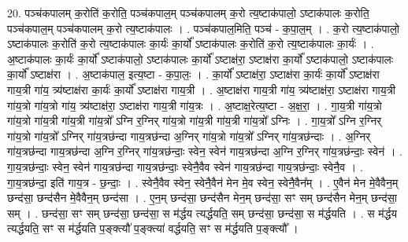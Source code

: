 \documentclass[17pt]{extarticle}
\begin{document}
20. पञ्च॑कपालम् क॒रोति॑ क॒रोति॒ पञ्च॑कपाल॒म् पञ्च॑कपालम् क॒रो त्य॒ष्टाक॑पालो॒ ऽष्टाक॑पालः क॒रोति॒ पञ्च॑कपाल॒म् पञ्च॑कपालम् क॒रो त्य॒ष्टाक॑पालः । . पञ्च॑कपाल॒मिति॒ पञ्च॑ - क॒पा॒ल॒म् । . क॒रो त्य॒ष्टाक॑पालो॒ ऽष्टाक॑पालः क॒रोति॑ क॒रो त्य॒ष्टाक॑पालः का॒र्यः॑ का॒र्यो᳚ ऽष्टाक॑पालः क॒रोति॑ क॒रो त्य॒ष्टाक॑पालः का॒र्यः॑ । . अ॒ष्टाक॑पालः का॒र्यः॑ का॒र्यो᳚ ऽष्टाक॑पालो॒ ऽष्टाक॑पालः का॒र्यो᳚ ऽष्टाक्ष॑रा॒ ऽष्टाक्ष॑रा का॒र्यो᳚ ऽष्टाक॑पालो॒ ऽष्टाक॑पालः का॒र्यो᳚ ऽष्टाक्ष॑रा । . अ॒ष्टाक॑पाल॒ इत्य॒ष्टा - क॒पा॒लः॒ । . का॒र्यो᳚ ऽष्टाक्ष॑रा॒ ऽष्टाक्ष॑रा का॒र्यः॑ का॒र्यो᳚ ऽष्टाक्ष॑रा गाय॒त्री गा॑य॒ त्र्य॑ष्टाक्ष॑रा का॒र्यः॑ का॒र्यो᳚ ऽष्टाक्ष॑रा गाय॒त्री । . अ॒ष्टाक्ष॑रा गाय॒त्री गा॑य॒ त्र्य॑ष्टाक्ष॑रा॒ ऽष्टाक्ष॑रा गाय॒त्री गा॑य॒त्रो गा॑य॒त्रो गा॑य॒ त्र्य॑ष्टाक्ष॑रा॒ ऽष्टाक्ष॑रा गाय॒त्री गा॑य॒त्रः । . अ॒ष्टाक्ष॒रेत्य॒ष्टा - अ॒क्ष॒रा॒ । . गा॒य॒त्री गा॑य॒त्रो गा॑य॒त्रो गा॑य॒त्री गा॑य॒त्री गा॑य॒त्रो᳚ ऽग्नि र॒ग्निर् गा॑य॒त्रो गा॑य॒त्री गा॑य॒त्री गा॑य॒त्रो᳚ ऽग्निः । . गा॒य॒त्रो᳚ ऽग्नि र॒ग्निर् गा॑य॒त्रो गा॑य॒त्रो᳚ ऽग्निर् गा॑य॒त्रछ॑न्दा गाय॒त्रछ॑न्दा अ॒ग्निर् गा॑य॒त्रो गा॑य॒त्रो᳚ ऽग्निर् गा॑य॒त्रछ॑न्दाः । . अ॒ग्निर् गा॑य॒त्रछ॑न्दा गाय॒त्रछ॑न्दा अ॒ग्नि र॒ग्निर् गा॑य॒त्रछ॑न्दाः॒ स्वेन॒ स्वेन॑ गाय॒त्रछ॑न्दा अ॒ग्नि र॒ग्निर् गा॑य॒त्रछ॑न्दाः॒ स्वेन॑ । . गा॒य॒त्रछ॑न्दाः॒ स्वेन॒ स्वेन॑ गाय॒त्रछ॑न्दा गाय॒त्रछ॑न्दाः॒ स्वेनै॒वैव स्वेन॑ गाय॒त्रछ॑न्दा गाय॒त्रछ॑न्दाः॒ स्वेनै॒व । . गा॒य॒त्रछ॑न्दा॒ इति॑ गाय॒त्र - छ॒न्दाः॒ । . स्वेनै॒वैव स्वेन॒ स्वेनै॒वैन॑ मेन मे॒व स्वेन॒ स्वेनै॒वैन᳚म् । . ए॒वैन॑ मेन मे॒वैवैन॒म् छन्द॑सा॒ छन्द॑सैन मे॒वैवैन॒म् छन्द॑सा । . ए॒न॒म् छन्द॑सा॒ छन्द॑सैन मेन॒म् छन्द॑सा॒ सꣳ सम् छन्द॑सैन मेन॒म् छन्द॑सा॒ सम् । . छन्द॑सा॒ सꣳ सम् छन्द॑सा॒ छन्द॑सा॒ स म॑र्द्धय त्यर्द्धयति॒ सम् छन्द॑सा॒ छन्द॑सा॒ स म॑र्द्धयति । . स म॑र्द्धय त्यर्द्धयति॒ सꣳ स म॑र्द्धयति प॒ङ्क्त्यौ॑ प॒ङ्क्त्या॑ वर्द्धयति॒ सꣳ स म॑र्द्धयति प॒ङ्क्त्यौ᳚ । \newline
\end{document}
